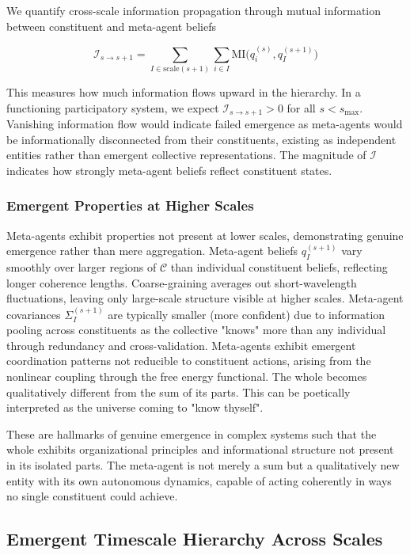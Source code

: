 \documentclass[11pt]{article}
\begin{document}
We quantify cross-scale information propagation through mutual information between constituent and meta-agent beliefs

\begin{equation}
\mathcal{I}_{s \to s+1} = \sum_{I \in \mathrm{scale}(s+1)} \sum_{i \in I} \mathrm{MI}\big(q_i^{(s)}, q_I^{(s+1)}\big)
\end{equation}

This measures how much information flows upward in the hierarchy. In a functioning participatory system, we expect $\mathcal{I}_{s \to s+1} > 0$ for all $s < s_{\max}$. Vanishing information flow would indicate failed emergence as meta-agents would be informationally disconnected from their constituents, existing as independent entities rather than emergent collective representations. The magnitude of $\mathcal{I}$ indicates how strongly meta-agent beliefs reflect constituent states.

\subsubsection{Emergent Properties at Higher Scales}

Meta-agents exhibit properties not present at lower scales, demonstrating genuine emergence rather than mere aggregation. Meta-agent beliefs $q_I^{(s+1)}$ vary smoothly over larger regions of $\mathcal{C}$ than individual constituent beliefs, reflecting longer coherence lengths. Coarse-graining averages out short-wavelength fluctuations, leaving only large-scale structure visible at higher scales. Meta-agent covariances $\Sigma_I^{(s+1)}$ are typically smaller (more confident) due to information pooling across constituents as the collective "knows" more than any individual through redundancy and cross-validation. Meta-agents exhibit emergent coordination patterns not reducible to constituent actions, arising from the nonlinear coupling through the free energy functional. The whole becomes qualitatively different from the sum of its parts. This can be poetically interpreted as the universe coming to "know thyself".

These are hallmarks of genuine emergence in complex systems such that the whole exhibits organizational principles and informational structure not present in its isolated parts. The meta-agent is not merely a sum but a qualitatively new entity with its own autonomous dynamics, capable of acting coherently in ways no single constituent could achieve.

\subsection{Emergent Timescale Hierarchy Across Scales}
\end{document}
